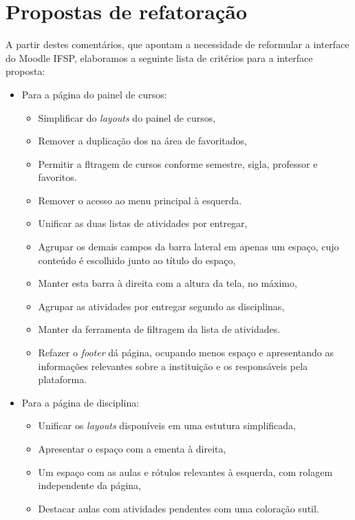 \documentclass[11pt]{article}
\begin{document}
\section*{Propostas de refatoração}
\label{sec:orgf9d512f}
A partir destes comentários, que apontam a necessidade de
reformular a interface do Moodle IFSP, elaboramos a seguinte lista de
critérios para a interface proposta:

\begin{itemize}
\item Para a página do painel de cursos:
\begin{itemize}
\item Simplificar do \emph{layouts} do painel de cursos,
\item Remover a duplicação dos na área de favoritados,
\item Permitir a fltragem de cursos conforme semestre, sigla, professor e
favoritos.
\vspace{1em}

\item Remover o acesso ao menu principal à esquerda.
\vspace{1em}

\item Unificar as duas listas de atividades por entregar,
\item Agrupar os demais campos da barra lateral em apenas um espaço,
cujo conteúdo é escolhido junto ao título do espaço,
\item Manter esta barra à direita com a altura da tela, no máximo,
\item Agrupar as atividades por entregar segundo as disciplinas,
\item Manter da ferramenta de filtragem  da lista de atividades.
\vspace{1em}

\item Refazer o \emph{footer} dá página, ocupando menos espaço e apresentando
as informações relevantes sobre a instituição e os responsáveis
pela plataforma.
\vspace{1em}
\end{itemize}

\item Para a página de disciplina:
\begin{itemize}
\item Unificar os \emph{layouts} disponíveis em uma estutura simplificada,
\item Apresentar o espaço com a ementa à direita,
\item Um espaço com as aulas e rótulos relevantes à esquerda, com
rolagem independente da página,
\item Destacar aulas com atividades pendentes com uma coloração sutil.
\vspace{1em}
\end{itemize}


\end{itemize}
\end{document}
